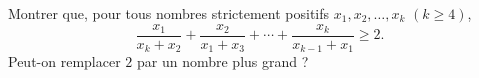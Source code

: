 Montrer que, pour tous nombres strictement positifs $x_1, x_2, \ldots, x_k$ $(k \geq 4)$,
\[ \frac{x_1}{x_k + x_2} + \frac{x_2}{x_1 + x_3} + \cdots + \frac{x_k}{x_{k-1} + x_1} \geq 2. \]
Peut-on remplacer $2$ par un nombre plus grand ?
